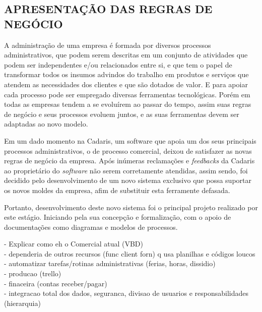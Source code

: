 \documentclass[
  12pt,				%
  openany,
  oneside,
  a4paper,			%
  english,			%
  brazil
]{article}
\numberwithin{figure}{section}
\numberwithin{table}{section}
\begin{document}
\subsection{APRESENTAÇÃO DAS REGRAS DE NEGÓCIO}


A administração de uma empresa é formada por diversos processos administrativos, que podem serem descritas em um conjunto de atividades que podem ser independentes e/ou relacionados entre si, e que tem o papel de transformar todos os insumos advindos do trabalho em produtos e serviços que atendem as necessidades dos clientes e que são dotados de valor.
E para apoiar cada processo pode ser empregado diversas ferramentas tecnológicas. Porém em todas as empresas tendem a se evoluírem ao passar do tempo, assim suas regras de negócio e seus processos evoluem juntos, e as suas ferramentas devem ser adaptadas ao novo modelo. 

Em um dado momento na Cadaris, um software que apoia um dos seus principais processos administrativos, o de processo comercial, deixou de satisfazer as novas regras de negócio da empresa. Após inúmeras reclamações e \textit{feedbacks} da Cadaris ao proprietário do \textit{software} não serem corretamente atendidas, assim sendo, foi decidido pelo desenvolvimento de um novo sistema exclusivo que possa suportar os novos moldes da empresa, afim de substituir esta ferramente defasada.

Portanto, desenvolvimento deste novo sistema foi o principal projeto realizado por este estágio. Iniciando pela sua concepção e formalização, com o apoio de documentações como diagramas e modelos de processos.




\noindent
- Explicar como eh o Comercial atual (VBD) \\
- dependeria de outros recursos (func client forn) q usa planilhas e códigos loucos  \\
- automatizar tarefas/rotinas administrativas (ferias, horas, dissidio) \\
- producao (trello) \\
- finaceira (contas receber/pagar) \\
- integracao total dos dados, seguranca, divisao de usuarios e responsabilidades (hierarquia) \\
\end{document}
